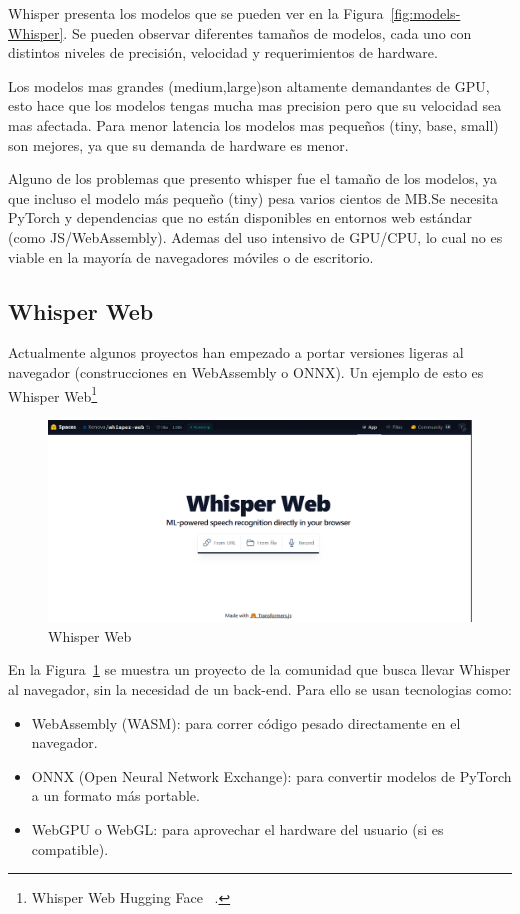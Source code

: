 \documentclass[a4paper, 12pt]{book}
\begin{document}
Whisper presenta los modelos que se pueden ver en la Figura~\ref{fig:models-Whisper}. Se pueden observar diferentes tamaños de modelos, cada uno con distintos niveles de precisión, velocidad y requerimientos de hardware.

Los modelos mas grandes (medium,large)son altamente demandantes de GPU, esto hace que los modelos tengas mucha mas precision pero que su velocidad sea mas afectada. Para menor latencia los modelos mas pequeños (tiny, base, small) son mejores, ya que su demanda de hardware es menor.

Alguno de los problemas que presento whisper fue el tamaño de los modelos, ya que incluso el modelo más pequeño (tiny) pesa varios cientos de MB.Se necesita PyTorch y dependencias que no están disponibles en entornos web estándar (como JS/WebAssembly). Ademas del uso intensivo de GPU/CPU, lo cual no es viable en la mayoría de navegadores móviles o de escritorio.

\subsection{Whisper Web}

Actualmente algunos proyectos han empezado a portar versiones ligeras al navegador (construcciones en WebAssembly o ONNX). Un ejemplo de esto es Whisper Web\footnote{Whisper Web Hugging Face  ~\cite{whisperweb}.}

\begin{figure}[H]
    \centering
    \includegraphics[width=0.8\linewidth]{img/WhisperWeb.png}
    \caption{Whisper Web}
    \label{fig:WhisperWeb}
\end{figure}

En la Figura~\ref{fig:WhisperWeb} se muestra un proyecto de la comunidad que busca llevar Whisper al navegador, sin la necesidad de un back-end. Para ello se usan tecnologias como:
\begin{itemize}
    \item WebAssembly (WASM): para correr código pesado directamente en el navegador.
    \item ONNX (Open Neural Network Exchange): para convertir modelos de PyTorch a un formato más portable.
    \item WebGPU o WebGL: para aprovechar el hardware del usuario (si es compatible).
\end{itemize}
\end{document}
